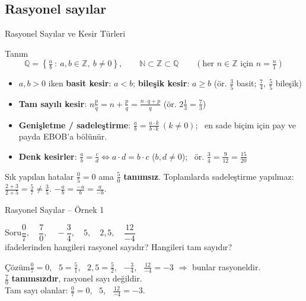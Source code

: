 \documentclass[aspectratio=169,11pt,handout]{beamer}
\newcommand{\soru}[3]{%
\begin{frame}{#1}
  \begin{block}{Soru}\large #2\end{block}
  \pause
  \begin{exampleblock}{Çözüm}\large #3\end{exampleblock}
\end{frame}}
\begin{document}
\subsection{Rasyonel sayılar}
\begin{frame}{Rasyonel Sayılar ve Kesir Türleri}
\begin{block}{Tanım}
\small
\[\mathbb{Q}=\left\{\tfrac{a}{b}\ :\ a,b\in\mathbb{Z},\ b\neq 0\right\},\qquad \mathbb{N}\subset\mathbb{Z}\subset\mathbb{Q}\qquad(\text{her } n\in\mathbb{Z} \text{ için } n=\tfrac{n}{1})\]
\vspace{-10pt}
\begin{itemize}\setlength{\itemsep}{1pt}
\item \(a,b>0\) iken \textbf{basit kesir}: \(a<b\); \quad \textbf{bileşik kesir}: \(a\ge b\) \quad (ör. \(\frac{3}{5}\) basit; \(\frac{7}{4},\ \frac{5}{5}\) bileşik)
\item \textbf{Tam sayılı kesir}: \(\displaystyle n\tfrac{p}{q}=n+\frac{p}{q}=\frac{n\cdot q+p}{q}\) \quad (ör. \(2\frac{1}{3}=\frac{7}{3}\))
\item \textbf{Genişletme / sadeleştirme}: \(\frac{a}{b}=\frac{a\cdot k}{b\cdot k}\ (k\neq 0)\); \ en sade biçim için pay ve payda EBOB'a bölünür.
\item \textbf{Denk kesirler}: \(\frac{a}{b}=\frac{c}{d}\iff a\cdot d=b\cdot c\) \quad (\(b,d\neq 0\)); \ ör. \(\frac{3}{4}=\frac{9}{12}=\frac{15}{20}\)
\end{itemize}
\end{block}
\begin{alertblock}{Sık yapılan hatalar}
\small\(\frac{0}{5}=0\) ama \(\frac{5}{0}\) \textbf{tanımsız}. \quad Toplamlarda sadeleştirme yapılmaz: \(\frac{2+3}{2+5}=\frac{5}{7}\neq\frac{3}{5}\). \quad \(-\frac{a}{b}=\frac{-a}{b}=\frac{a}{-b}\).
\end{alertblock}
\end{frame}

\soru{Rasyonel Sayılar -- Örnek 1}
{\(\dfrac{0}{7},\quad \dfrac{7}{0},\quad -\dfrac{3}{4},\quad 5,\quad 2{,}5,\quad \dfrac{12}{-4}\) \\[4pt] ifadelerinden hangileri rasyonel sayıdır? Hangileri tam sayıdır?}
{\(\frac{0}{7}=0\), \ \(5=\frac{5}{1}\), \ \(2{,}5=\frac{5}{2}\), \ \(-\frac{3}{4}\), \ \(\frac{12}{-4}=-3\) \quad \(\Rightarrow\) bunlar rasyoneldir.\\
\(\frac{7}{0}\) \textbf{tanımsızdır}, rasyonel sayı değildir.\\[4pt]
Tam sayı olanlar: \(\frac{0}{7}=0\), \ \(5\), \ \(\frac{12}{-4}=-3\).}
\end{document}

